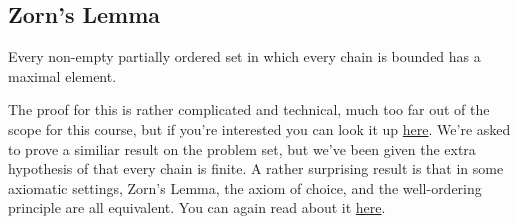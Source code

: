 \subsection{Zorn's Lemma}
\begin{lemma}
    Every non-empty partially ordered set in which every chain is bounded has a maximal element.
\end{lemma}
The proof for this is rather complicated and technical, much too far out of the scope for this course, but if you're interested you can look it up \href{https://pi.math.cornell.edu/~kbrown/6310/zorn.pdf}{here}. We're asked to prove a similiar result on the problem set, but we've been given the extra hypothesis of that every chain is finite. A rather surprising result is that in some axiomatic settings, Zorn's Lemma, the axiom of choice, and the well-ordering principle are all equivalent. You can again read about it \href{https://www.borisbukh.org/MathStudiesAlgebra1718/notes_ac.pdf}{here}.

